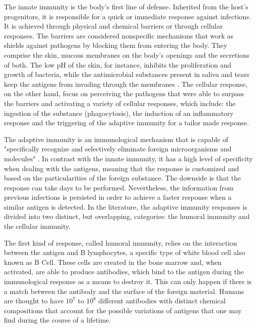 The innate immunity is the body's first line of defense. Inherited from the host's progenitors, it is responsible for a quick or immediate response against infections. It is achieved through physical and chemical barriers or through cellular responses. The barriers are considered nonspecific mechanisms that work as shields against pathogens by blocking them from entering the body. They comprise the skin, mucous membranes on the body's openings and the secretions of both. The low pH of the skin, for instance, inhibits the proliferation and growth of bacteria, while the antimicrobial substances present in saliva and tears keep the antigens from invading through the membranes \cite{ICBook2009}. The cellular response, on the other hand, focus on perceiving the pathogens that were able to surpass the barriers and activating a variety of cellular responses, which include: the ingestion of the substance (phagocytosis), the induction of an inflammatory response and the triggering of the adaptive immunity for a tailor made response. 

The adaptive immunity is an immunological mechanism that is capable of "specifically recognize and selectively eliminate foreign microorganisms and molecules" \cite{ICBook2009}. In contrast with the innate immunity, it has a high level of specificity when dealing with the antigens, meaning that the response is customized and based on the particularities of the foreign substance. The downside is that the response can take days to be performed. Nevertheless, the information from previous infections is persisted in order to achieve a faster response when a similar antigen is detected. In the literature, the adaptive immunity responses is divided into two distinct, but overlapping, categories: the humoral immunity and the cellular immunity.

The first kind of response, called humoral immunity, relies on the interaction between the antigen and B lymphocytes, a specific type of white blood cell also known as B Cell. These cells are created in the bone marrow and, when activated, are able to produce antibodies, which bind to the antigen during the immunological response as a means to destroy it. This can only happen if there is a match between the antibody and the surface of the foreign material. Humans are thought to have \(10^7\) to \(10^8\) different antibodies with distinct chemical compositions \cite{ImmuneSysAdapML1986} that account for the possible variations of antigens that one may find during the course of a lifetime.

